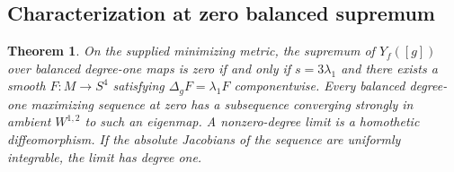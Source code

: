 \documentclass[11pt]{article}
\numberwithin{equation}{section}
\newtheorem{theorem}{Theorem}[section]
\newcommand{\Yf}{Y_f([g])}
\begin{document}
\subsection{Characterization at zero balanced supremum}

\begin{theorem}\label{thm:balance}
On the supplied minimizing metric, the supremum of \(\Yf\)
over balanced degree-one maps is zero if and only if
\(s=3\lambda_1\) and there exists a smooth
\(F:M\to S^4\) satisfying \(\Delta_g F=\lambda_1 F\)
componentwise. Every balanced degree-one maximizing sequence at
zero has a subsequence converging strongly in ambient \(W^{1,2}\)
to such an eigenmap. A nonzero-degree limit is a homothetic
diffeomorphism. If the absolute Jacobians of the sequence are
uniformly integrable, the limit has degree one.
\end{theorem}
\end{document}
